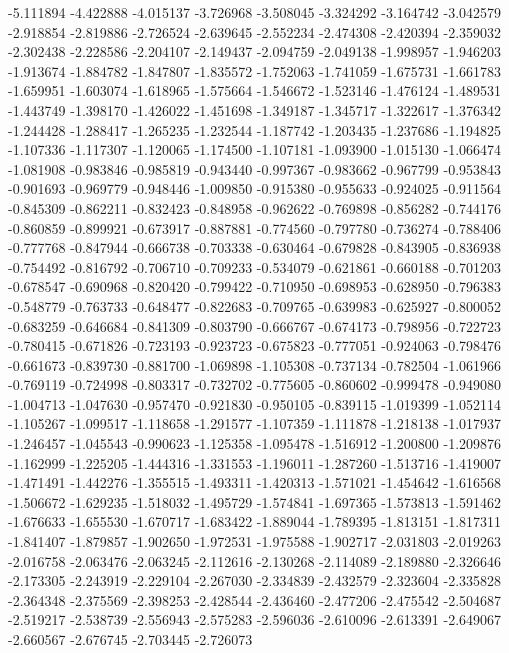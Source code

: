 -5.111894
-4.422888
-4.015137
-3.726968
-3.508045
-3.324292
-3.164742
-3.042579
-2.918854
-2.819886
-2.726524
-2.639645
-2.552234
-2.474308
-2.420394
-2.359032
-2.302438
-2.228586
-2.204107
-2.149437
-2.094759
-2.049138
-1.998957
-1.946203
-1.913674
-1.884782
-1.847807
-1.835572
-1.752063
-1.741059
-1.675731
-1.661783
-1.659951
-1.603074
-1.618965
-1.575664
-1.546672
-1.523146
-1.476124
-1.489531
-1.443749
-1.398170
-1.426022
-1.451698
-1.349187
-1.345717
-1.322617
-1.376342
-1.244428
-1.288417
-1.265235
-1.232544
-1.187742
-1.203435
-1.237686
-1.194825
-1.107336
-1.117307
-1.120065
-1.174500
-1.107181
-1.093900
-1.015130
-1.066474
-1.081908
-0.983846
-0.985819
-0.943440
-0.997367
-0.983662
-0.967799
-0.953843
-0.901693
-0.969779
-0.948446
-1.009850
-0.915380
-0.955633
-0.924025
-0.911564
-0.845309
-0.862211
-0.832423
-0.848958
-0.962622
-0.769898
-0.856282
-0.744176
-0.860859
-0.899921
-0.673917
-0.887881
-0.774560
-0.797780
-0.736274
-0.788406
-0.777768
-0.847944
-0.666738
-0.703338
-0.630464
-0.679828
-0.843905
-0.836938
-0.754492
-0.816792
-0.706710
-0.709233
-0.534079
-0.621861
-0.660188
-0.701203
-0.678547
-0.690968
-0.820420
-0.799422
-0.710950
-0.698953
-0.628950
-0.796383
-0.548779
-0.763733
-0.648477
-0.822683
-0.709765
-0.639983
-0.625927
-0.800052
-0.683259
-0.646684
-0.841309
-0.803790
-0.666767
-0.674173
-0.798956
-0.722723
-0.780415
-0.671826
-0.723193
-0.923723
-0.675823
-0.777051
-0.924063
-0.798476
-0.661673
-0.839730
-0.881700
-1.069898
-1.105308
-0.737134
-0.782504
-1.061966
-0.769119
-0.724998
-0.803317
-0.732702
-0.775605
-0.860602
-0.999478
-0.949080
-1.004713
-1.047630
-0.957470
-0.921830
-0.950105
-0.839115
-1.019399
-1.052114
-1.105267
-1.099517
-1.118658
-1.291577
-1.107359
-1.111878
-1.218138
-1.017937
-1.246457
-1.045543
-0.990623
-1.125358
-1.095478
-1.516912
-1.200800
-1.209876
-1.162999
-1.225205
-1.444316
-1.331553
-1.196011
-1.287260
-1.513716
-1.419007
-1.471491
-1.442276
-1.355515
-1.493311
-1.420313
-1.571021
-1.454642
-1.616568
-1.506672
-1.629235
-1.518032
-1.495729
-1.574841
-1.697365
-1.573813
-1.591462
-1.676633
-1.655530
-1.670717
-1.683422
-1.889044
-1.789395
-1.813151
-1.817311
-1.841407
-1.879857
-1.902650
-1.972531
-1.975588
-1.902717
-2.031803
-2.019263
-2.016758
-2.063476
-2.063245
-2.112616
-2.130268
-2.114089
-2.189880
-2.326646
-2.173305
-2.243919
-2.229104
-2.267030
-2.334839
-2.432579
-2.323604
-2.335828
-2.364348
-2.375569
-2.398253
-2.428544
-2.436460
-2.477206
-2.475542
-2.504687
-2.519217
-2.538739
-2.556943
-2.575283
-2.596036
-2.610096
-2.613391
-2.649067
-2.660567
-2.676745
-2.703445
-2.726073
